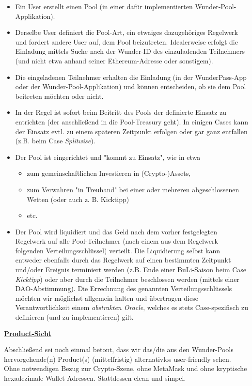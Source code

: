 \begin{itemize}
  \item Ein User erstellt einen Pool (in einer dafür implementierten Wunder-Pool-Applikation).
  \item Derselbe User definiert die Pool-Art, ein etwaiges dazugehöriges Regelwerk und fordert andere User auf, dem Pool beizutreten. Idealerweise erfolgt die Einladung mittels Suche nach der Wunder-ID des einzuladenden Teilnehmers (und nicht etwa anhand seiner Ethereum-Adresse oder sonstigem).
  \item Die eingeladenen Teilnehmer erhalten die Einladung (in der WunderPass-App oder der Wunder-Pool-Applikation) und können entscheiden, ob sie dem Pool beitreten möchten oder nicht. 
  \item In der Regel ist sofort beim Beitritt des Pools der definierte Einsatz zu entrichten (der anschließend in die Pool-Treasury geht). In einigen Cases kann der Einsatz evtl. zu einem späteren Zeitpunkt erfolgen oder gar ganz entfallen (z.B. beim Case \textit{Splitwise}).
  \item Der Pool ist eingerichtet und "kommt zu Einsatz", wie in etwa
  \begin{itemize}
  	\item zum gemeinschaftlichen Investieren in (Crypto-)Assets,
  	\item zum Verwahren "in Treuhand" bei einer oder mehreren abgeschlossenen Wetten (oder auch z. B. Kicktipp)
  	\item etc.
  \end{itemize}
  \item Der Pool wird liquidiert und das Geld nach dem vorher festgelegten Regelwerk auf alle Pool-Teilnehmer (nach einem aus dem Regelwerk folgenden Verteilungsschlüssel) verteilt. Die Liquidierung selbst kann entweder ebenfalls durch das Regelwerk auf einen bestimmten Zeitpunkt und/oder Ereignis terminiert werden (z.B. Ende einer BuLi-Saison beim Case \textit{Kicktipp}) oder aber durch die Teilnehmer beschlossen werden (mittels einer DAO-Abstimmung). Die Errechnung des genannten Verteilungsschlüssels möchten wir möglichst allgemein halten und übertragen diese Verantwortlichkeit einem \textit{abstrakten Oracle}, welches es stets Case-spezifisch zu definieren (und zu implementieren) gilt.
\end{itemize}

\vspace{0.2cm}

\underline{\textbf{Product-Sicht}}

\vspace{0.2cm}

Abschließend sei noch einmal betont, dass wir das/die aus den Wunder-Pools hervorgehende(n) Product(s) (mittelfristig) alternativlos user-friendly sehen. Ohne notwendigen Bezug zur Crypto-Szene, ohne MetaMask und ohne kryptische hexadezimale Wallet-Adressen. Stattdessen clean und simpel.

\vspace{0.5cm}